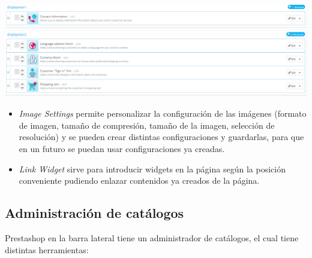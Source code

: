 \documentclass{article}
\begin{document}
\begin{center}
\includegraphics[scale=0.3]{images/positions.png}
\end{center}

\begin{itemize}
\item[\triangleright] \textit{Image Settings} permite personalizar la configuración de las imágenes (formato de imagen, tamaño de compresión, tamaño de la imagen, selección de resolución) y se pueden crear distintas configuraciones y guardarlas, para que en un futuro se puedan usar configuraciones ya creadas.
\end{itemize}

\begin{itemize}
\item[\triangleright] \textit{Link Widget} sirve para introducir widgets en la página según la posición conveniente pudiendo enlazar contenidos ya creados de la página.
\end{itemize}

\subsection{Administración de catálogos}

Prestashop en la barra lateral tiene un administrador de catálogos, el cual tiene distintas herramientas:
\end{document}
